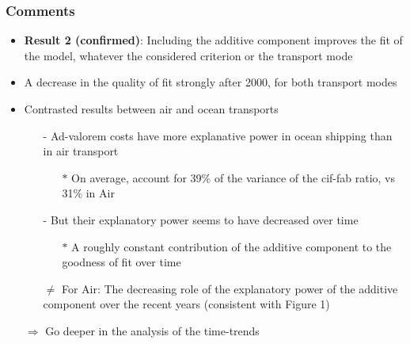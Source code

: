 \documentclass[10 pt,Helvetica, french]{beamer}
\begin{document}
\begin{frame}
\frametitle{Comments}
\begin{itemize}
\item \textbf{Result 2 (confirmed)}: Including the additive component improves the fit of the model, whatever the considered criterion or the transport mode \vspace{0.1cm}
\item A decrease in the quality of fit strongly after 2000, for both transport modes \vspace{0.1cm}
\item Contrasted results between air and ocean transports \vspace{0.1cm}
\begin{itemize}
\item[-] Ad-valorem costs have more explanative power in ocean shipping than in air transport \vspace{0.1cm}
\begin{itemize}
\item[$\ast$] On average, account for 39\% of the variance of the cif-fab ratio, vs 31\% in Air \vspace{0.1cm}
\end{itemize}
\item[-] But their explanatory power seems to have decreased over time \vspace{0.1cm}
\begin{itemize}
\item[$\ast$] A roughly constant contribution of the additive component to the goodness of fit over time \vspace{0.1cm}
\end{itemize}
\item[$\neq$] For Air: The decreasing role of the explanatory power of the additive component over the recent years (consistent with Figure 1)\vspace{0.1cm}
\end{itemize}
\item[$\Rightarrow$] Go deeper in the analysis of the time-trends
\end{itemize}
\end{frame}
\end{document}
